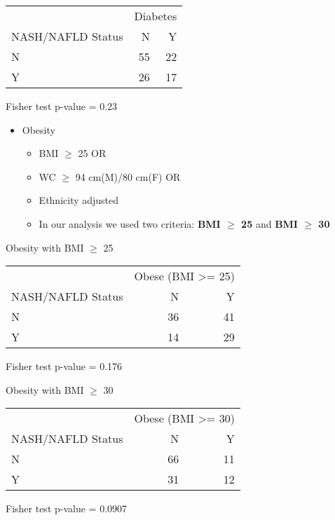 \documentclass[
]{article}
\providecommand{\tightlist}{%
  \setlength{\itemsep}{0pt}\setlength{\parskip}{0pt}}
\begin{document}
\begingroup
\fontsize{12.0pt}{14.4pt}\selectfont
\setlength{\LTpost}{0mm}
\begin{longtable}{l|rr}
\toprule
 & \multicolumn{2}{c}{Diabetes} \\ 
\cmidrule(lr){2-3}
NASH/NAFLD Status & N & Y \\ 
\midrule\addlinespace[2.5pt]
N & 55 & 22 \\ 
Y & 26 & 17 \\ 
\bottomrule
\end{longtable}
\begin{minipage}{\linewidth}
Fisher test p-value =  0.23\\
\end{minipage}
\endgroup

\begin{itemize}
\tightlist
\item
  Obesity

  \begin{itemize}
  \tightlist
  \item
    BMI \(\ge\) 25 OR
  \item
    WC \(\ge\) 94 cm(M)/80 cm(F) OR
  \item
    Ethnicity adjusted
  \item
    In our analysis we used two criteria: \textbf{BMI \(\ge\) 25} and
    \textbf{BMI \(\ge\) 30}
  \end{itemize}
\end{itemize}

Obesity with BMI \(\ge\) 25 \begingroup
\fontsize{12.0pt}{14.4pt}\selectfont \setlength{\LTpost}{0mm}

\begin{longtable}{l|rr}
\toprule
 & \multicolumn{2}{c}{Obese (BMI >= 25)} \\ 
\cmidrule(lr){2-3}
NASH/NAFLD Status & N & Y \\ 
\midrule\addlinespace[2.5pt]
N & 36 & 41 \\ 
Y & 14 & 29 \\ 
\bottomrule
\end{longtable}
\begin{minipage}{\linewidth}
Fisher test p-value =  0.176\\
\end{minipage}
\endgroup
\pagebreak

Obesity with BMI \(\ge\) 30 \begingroup
\fontsize{12.0pt}{14.4pt}\selectfont \setlength{\LTpost}{0mm}

\begin{longtable}{l|rr}
\toprule
 & \multicolumn{2}{c}{Obese (BMI >= 30)} \\ 
\cmidrule(lr){2-3}
NASH/NAFLD Status & N & Y \\ 
\midrule\addlinespace[2.5pt]
N & 66 & 11 \\ 
Y & 31 & 12 \\ 
\bottomrule
\end{longtable}
\begin{minipage}{\linewidth}
Fisher test p-value =  0.0907\\
\end{minipage}
\endgroup
\end{document}
